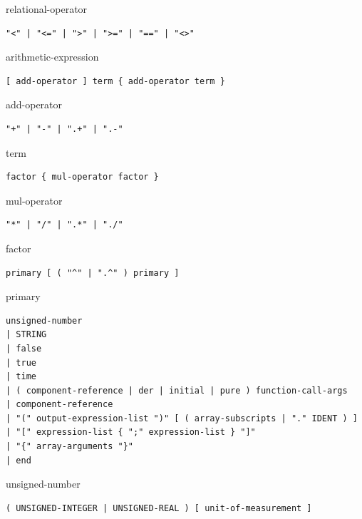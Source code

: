 \begin{production}{relational-operator}
\begin{lstlisting}
"<" | "<=" | ">" | ">=" | "==" | "<>"
\end{lstlisting}
\end{production}

\begin{production}{arithmetic-expression}
\begin{lstlisting}
[ add-operator ] term { add-operator term }
\end{lstlisting}
\end{production}

\begin{production}{add-operator}
\begin{lstlisting}
"+" | "-" | ".+" | ".-"
\end{lstlisting}
\end{production}

\begin{production}{term}
\begin{lstlisting}
factor { mul-operator factor }
\end{lstlisting}
\end{production}

\begin{production}{mul-operator}
\begin{lstlisting}
"*" | "/" | ".*" | "./"
\end{lstlisting}
\end{production}

\begin{production}{factor}
\begin{lstlisting}
primary [ ( "^" | ".^" ) primary ]
\end{lstlisting}
\end{production}

\begin{production}{primary}
\begin{lstlisting}
unsigned-number
| STRING
| false
| true
| time
| ( component-reference | der | initial | pure ) function-call-args
| component-reference
| "(" output-expression-list ")" [ ( array-subscripts | "." IDENT ) ]
| "[" expression-list { ";" expression-list } "]"
| "{" array-arguments "}"
| end
\end{lstlisting}
\end{production}

\begin{production}{unsigned-number}
\begin{lstlisting}
( UNSIGNED-INTEGER | UNSIGNED-REAL ) [ unit-of-measurement ]
\end{lstlisting}
\end{production}

